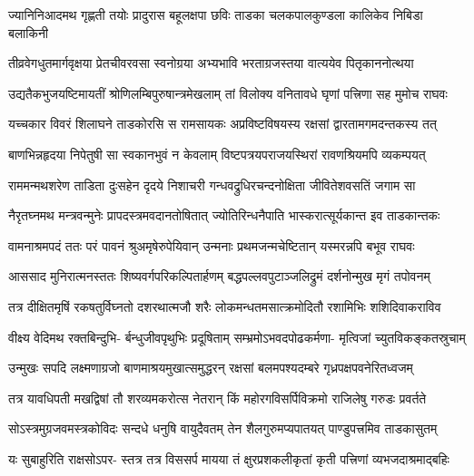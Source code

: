 \twolineshloka
{ज्यानिनिआदमथ गृह्णती तयोः प्रादुरास बहूलक्षपा छविः}
{ताडका चलकपालकुण्डला कालिकेव निबिडा बलाकिनी} %

\fourlineindentedshloka
{तीव्रवेगधुतमार्गवृक्षया}
{प्रेतचीवरवसा स्वनोग्रया}
{अभ्यभावि भरताग्रजस्तया}
{वात्ययेव पितृकाननोत्थया} %

\fourlineindentedshloka
{उद्यतैकभुजयष्टिमायतीं}
{श्रोणिलम्बिपुरुषान्त्रमेखलाम्}
{तां विलोक्य वनितावधे घृणां}
{पत्त्रिणा सह मुमोच राघवः} %

\twolineshloka
{यच्चकार विवरं शिलाघने ताडकोरसि स रामसायकः}
{अप्रविष्टविषयस्य रक्षसां द्वारतामगमदन्तकस्य तत्} %

\twolineshloka
{बाणभिन्नहृदया निपेतुषी सा स्वकानभुवं न केवलाम्}
{विष्टपत्रयपराजयस्थिरां रावणश्रियमपि व्यकम्पयत्} %

\fourlineindentedshloka
{राममन्मथशरेण ताडिता}
{दुःसहेन दृदये निशाचरी}
{गन्धवद्रुधिरचन्दनोक्षिता}
{जीवितेशवसतिं जगाम सा} %

\twolineshloka
{नैरृतघ्नमथ मन्त्रवन्मुनेः प्रापदस्त्रमवदानतोषितात्}
{ज्योतिरिन्धनैपाति भास्करात्सूर्यकान्त इव ताडकान्तकः} %

\fourlineindentedshloka
{वामनाश्रमपदं ततः परं}
{पावनं श्रुअमृषेरुपेयिवान्}
{उन्मनाः प्रथमजन्मचेष्टितान्}
{यस्मरन्नपि बभूव राघवः} %

\fourlineindentedshloka
{आससाद मुनिरात्मनस्ततः}
{शिष्यवर्गपरिकल्पितार्हणम्}
{बद्धपल्लवपुटाञ्जलिद्रुमं}
{दर्शनोन्मुख मृगं तपोवनम्} %

\twolineshloka
{तत्र दीक्षितमृषिं रकषतुर्विघ्नतो दशरथात्मजौ शरैः}
{लोकमन्धतमसात्क्रमोदितौ रशामिभिः शशिदिवाकराविव} %

\fourlineindentedshloka
{वीक्ष्य वेदिमथ रक्तबिन्दुभि-}
{र्बन्धुजीवपृथुभिः प्रदूषिताम्}
{सम्भ्रमोऽभवदपोढकर्मणा-}
{मृत्विजां च्युतविकङ्कतस्रुचाम्} %

\fourlineindentedshloka
{उन्मुखः सपदि लक्ष्मणाग्रजो}
{बाणमाश्रयमुखात्समुद्धरन्}
{रक्षसां बलमपश्यदम्बरे}
{गृध्रपक्षपवनेरितध्वजम्} %

\fourlineindentedshloka
{तत्र यावधिपती मखद्विषां}
{तौ शरव्यमकरोत्स नेतरान्}
{किं महोरगविसर्पिविक्रमो}
{राजिलेषु गरुडः प्रवर्तते} %

\fourlineindentedshloka
{सोऽस्त्रमुग्रजवमस्त्रकोविदः}
{सन्दधे धनुषि वायुदैवतम्}
{तेन शैलगुरुमप्यपातयत्}
{पाण्डुपत्त्रमिव ताडकासुतम्} %

\fourlineindentedshloka
{यः सुबाहुरिति राक्षसोऽपर-}
{स्तत्र तत्र विससर्प मायया}
{तं क्षुरप्रशकलीकृतां कृती}
{पत्त्रिणां व्यभजदाश्रमाद्बहिः} %

